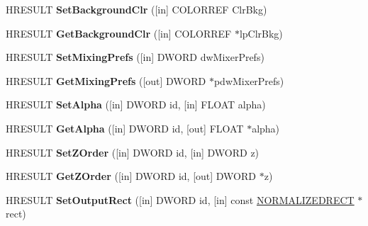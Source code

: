 \begin{DoxyCompactItemize}
H\+R\+E\+S\+U\+LT {\bfseries Set\+Background\+Clr} (\mbox{[}in\mbox{]} C\+O\+L\+O\+R\+R\+EF Clr\+Bkg)
\item 
\mbox{\label{interface_i_v_m_r_mixer_control_ab8e783dd3eaced41e2b073b7ed331174}} 
H\+R\+E\+S\+U\+LT {\bfseries Get\+Background\+Clr} (\mbox{[}in\mbox{]} C\+O\+L\+O\+R\+R\+EF $\ast$lp\+Clr\+Bkg)
\item 
\mbox{\label{interface_i_v_m_r_mixer_control_a9f23900a21b0b0a8a970050c0b7cf940}} 
H\+R\+E\+S\+U\+LT {\bfseries Set\+Mixing\+Prefs} (\mbox{[}in\mbox{]} D\+W\+O\+RD dw\+Mixer\+Prefs)
\item 
\mbox{\label{interface_i_v_m_r_mixer_control_a47f3cebde043a4e6fca3908e12739fc7}} 
H\+R\+E\+S\+U\+LT {\bfseries Get\+Mixing\+Prefs} (\mbox{[}out\mbox{]} D\+W\+O\+RD $\ast$pdw\+Mixer\+Prefs)
\item 
\mbox{\label{interface_i_v_m_r_mixer_control_a9b3bbd8533e13c9092592aa1bf445e31}} 
H\+R\+E\+S\+U\+LT {\bfseries Set\+Alpha} (\mbox{[}in\mbox{]} D\+W\+O\+RD id, \mbox{[}in\mbox{]} F\+L\+O\+AT alpha)
\item 
\mbox{\label{interface_i_v_m_r_mixer_control_abf6e0119bf14aa80d2fd609915900799}} 
H\+R\+E\+S\+U\+LT {\bfseries Get\+Alpha} (\mbox{[}in\mbox{]} D\+W\+O\+RD id, \mbox{[}out\mbox{]} F\+L\+O\+AT $\ast$alpha)
\item 
\mbox{\label{interface_i_v_m_r_mixer_control_acd6b1a535566b8e878f945f97455f88a}} 
H\+R\+E\+S\+U\+LT {\bfseries Set\+Z\+Order} (\mbox{[}in\mbox{]} D\+W\+O\+RD id, \mbox{[}in\mbox{]} D\+W\+O\+RD z)
\item 
\mbox{\label{interface_i_v_m_r_mixer_control_ab323bf74ed3cfece6b71eb3bd6a2014e}} 
H\+R\+E\+S\+U\+LT {\bfseries Get\+Z\+Order} (\mbox{[}in\mbox{]} D\+W\+O\+RD id, \mbox{[}out\mbox{]} D\+W\+O\+RD $\ast$z)
\item 
\mbox{\label{interface_i_v_m_r_mixer_control_aa32a2e98c14ff451786f5be99ee980b0}} 
H\+R\+E\+S\+U\+LT {\bfseries Set\+Output\+Rect} (\mbox{[}in\mbox{]} D\+W\+O\+RD id, \mbox{[}in\mbox{]} const \hyperlink{struct___n_o_r_m_a_l_i_z_e_d_r_e_c_t}{N\+O\+R\+M\+A\+L\+I\+Z\+E\+D\+R\+E\+CT} $\ast$rect)

\end{DoxyCompactItemize}
